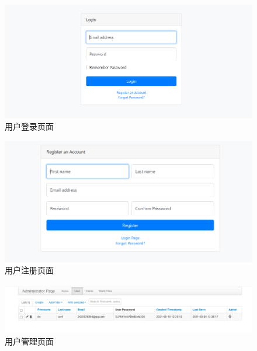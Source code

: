 \begin{figure}[htbp]
	\centering
	\includegraphics[width=0.85\linewidth]{figure/5-1}
	\caption{用户登录页面}
\end{figure}
\begin{figure}[H]
	\centering
	\includegraphics[width=0.85\linewidth]{figure/5-2}
	\caption{用户注册页面}
\end{figure}
\begin{figure}[H]
	\centering
	\includegraphics[width=0.85\linewidth]{figure/5-3}
	\caption{用户管理页面}
\end{figure}
